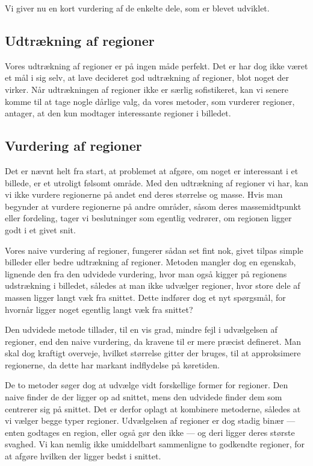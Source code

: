{
{\sffamily Vi giver nu en kort vurdering af de enkelte dele, som er
blevet udviklet.
}

\subsection{Udtrækning af regioner}
Vores udtrækning af regioner er på ingen måde perfekt. Det er har dog
ikke været et mål i sig selv, at lave decideret god udtrækning af
regioner, blot noget der virker. Når udtrækningen af regioner ikke er
særlig sofistikeret, kan vi senere komme til at tage nogle dårlige valg,
da vores metoder, som vurderer regioner, antager, at den kun modtager
interessante regioner i billedet.

\subsection{Vurdering af regioner}
Det er nævnt helt fra start, at problemet at afgøre, om noget er
interessant i et billede, er et utroligt følsomt område. Med den
udtrækning af regioner vi har, kan vi ikke vurdere regionerne på andet
end deres størrelse og masse. Hvis man begynder at vurdere regionerne på
andre områder, såsom deres massemidtpunkt eller fordeling, tager vi
beslutninger som egentlig vedrører, om regionen ligger godt i et givet
snit.

Vores naive vurdering af regioner, fungerer sådan set fint nok, givet
tilpas simple billeder eller bedre udtrækning af regioner. Metoden
mangler dog en egenskab, lignende den fra den udvidede vurdering, hvor
man også kigger på regionens udstrækning i billedet, således at man ikke
udvælger regioner, hvor store dele af massen ligger langt væk fra
snittet. Dette indfører dog et nyt spørgsmål, for hvornår ligger noget
egentlig langt væk fra snittet?

Den udvidede metode tillader, til en vis grad, mindre fejl i udvælgelsen
af regioner, end den naive vurdering, da kravene til er mere præcist
defineret. Man skal dog kraftigt overveje, hvilket størrelse gitter der
bruges, til at approksimere regionerne, da dette har markant indflydelse
på køretiden.

De to metoder søger dog at udvælge vidt forskellige former for regioner.
Den naive finder de der ligger op ad snittet, mens den udvidede finder
dem som centrerer sig på snittet. Det er derfor oplagt at kombinere
metoderne, således at vi vælger begge typer regioner. Udvælgelsen af
regioner er dog stadig binær --- enten godtages en region, eller også
gør den ikke --- og deri ligger deres største svaghed. Vi kan nemlig
ikke umiddelbart sammenligne to godkendte regioner, for at afgøre
hvilken der ligger bedst i snittet.

}
